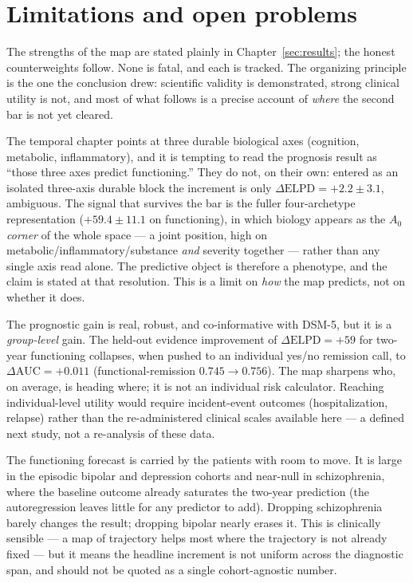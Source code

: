 \section{Limitations and open problems}
\label{sec:limitations}

The strengths of the map are stated plainly in Chapter~\ref{sec:results}; the honest counterweights follow.
None is fatal, and each is tracked. The organizing principle is the one the conclusion drew: scientific
validity is demonstrated, strong clinical utility is not, and most of what follows is a precise account of
\emph{where} the second bar is not yet cleared.

\begin{openbox}
The temporal chapter points at three durable biological axes (cognition, metabolic, inflammatory), and it
is tempting to read the prognosis result as ``those three axes predict functioning.'' They do not, on their
own: entered as an isolated three-axis durable block the increment is only $\Delta\text{ELPD}=+2.2\pm3.1$,
ambiguous. The signal that survives the bar is the fuller four-archetype representation
($+59.4\pm11.1$ on functioning), in which biology appears as the $A_0$ \emph{corner} of the whole space ---
a joint position, high on metabolic/inflammatory/substance \emph{and} severity together --- rather than any
single axis read alone. The predictive object is therefore a phenotype, and the claim is stated at that
resolution. This is a limit on \emph{how} the map predicts, not on whether it does.
\end{openbox}

\begin{openbox}
The prognostic gain is real, robust, and co-informative with DSM-5, but it is a \emph{group-level} gain.
The held-out evidence improvement of $\Delta\text{ELPD}=+59$ for two-year functioning collapses, when
pushed to an individual yes/no remission call, to $\Delta\text{AUC}=+0.011$ (functional-remission
$0.745\to0.756$). The map sharpens who, on average, is heading where; it is not an individual risk
calculator. Reaching individual-level utility would require incident-event outcomes (hospitalization,
relapse) rather than the re-administered clinical scales available here --- a defined next study, not a
re-analysis of these data.
\end{openbox}

\begin{openbox}
The functioning forecast is carried by the patients with room to move. It is large in the episodic bipolar
and depression cohorts and near-null in schizophrenia, where the baseline outcome already saturates the
two-year prediction (the autoregression leaves little for any predictor to add). Dropping schizophrenia
barely changes the result; dropping bipolar nearly erases it. This is clinically sensible --- a map of
trajectory helps most where the trajectory is not already fixed --- but it means the headline increment is
not uniform across the diagnostic span, and should not be quoted as a single cohort-agnostic number.
\end{openbox}

